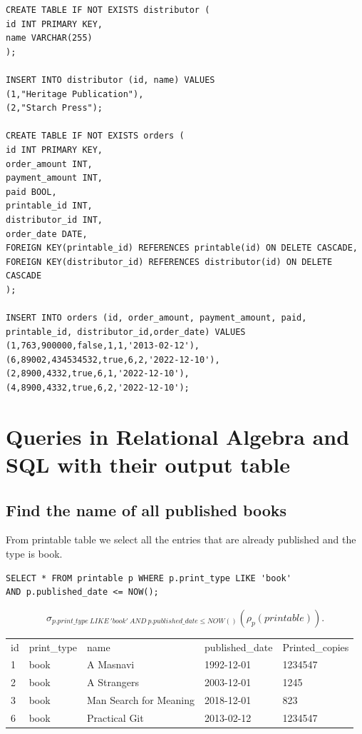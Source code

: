 \documentclass{article}
\begin{document}
\begin{lstlisting}
CREATE TABLE IF NOT EXISTS distributor (                                   
id INT PRIMARY KEY,                                                        
name VARCHAR(255)                                                     
); 

INSERT INTO distributor (id, name) VALUES 
(1,"Heritage Publication"),
(2,"Starch Press");

CREATE TABLE IF NOT EXISTS orders (                                        
id INT PRIMARY KEY,                                                        
order_amount INT,                                                          
payment_amount INT,                                                        
paid BOOL,
printable_id INT,
distributor_id INT,
order_date DATE,
FOREIGN KEY(printable_id) REFERENCES printable(id) ON DELETE CASCADE,      
FOREIGN KEY(distributor_id) REFERENCES distributor(id) ON DELETE CASCADE
);

INSERT INTO orders (id, order_amount, payment_amount, paid, printable_id, distributor_id,order_date) VALUES 
(1,763,900000,false,1,1,'2013-02-12'),
(6,89002,434534532,true,6,2,'2022-12-10'),
(2,8900,4332,true,6,1,'2022-12-10'),
(4,8900,4332,true,6,2,'2022-12-10');	
\end{lstlisting}
\section{Queries in Relational Algebra and SQL with their output table}

\subsection{Find the name of all published books}

\begin{flushleft}
	From printable table we select all the entries that are already published and the type is book.
\end{flushleft}
\begin{lstlisting}[frame=single]
SELECT * FROM printable p WHERE p.print_type LIKE 'book'
AND p.published_date <= NOW();	
\end{lstlisting} 

\[
	\sigma_{p.print\_type\ LIKE\ 'book'\ AND\ p.published\_date \le NOW()}(\rho_{p}(printable))
.\]

\begin{table}[h]
\begin{tabular}{lllll}
id & print\_type & name                   & published\_date & Printed\_copies \\
1  & book        & A Masnavi              & 1992-12-01      & 1234547         \\
2  & book        & A Strangers            & 2003-12-01      & 1245            \\
3  & book        & Man Search for Meaning & 2018-12-01      & 823             \\
6  & book        & Practical Git          & 2013-02-12      & 1234547        
\end{tabular}
\end{table}
\end{document}
